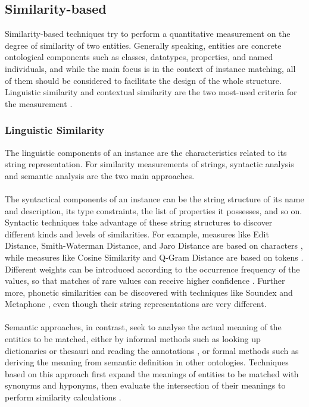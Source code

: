 \subsection{Similarity-based}

Similarity-based techniques try to perform a quantitative measurement on the degree of similarity of two entities. Generally speaking, entities are concrete ontological components such as classes, datatypes, properties, and named individuals, and while the main focus is in the context of instance matching, all of them should be considered to facilitate the design of the whole structure. Linguistic similarity and contextual similarity are the two most-used criteria for the measurement \cite{DBLP:conf/ic3k/Nguyen015}.

\subsubsection{Linguistic Similarity}

The linguistic components of an instance are the characteristics related to its string representation. For similarity measurements of strings, syntactic analysis and semantic analysis are the two main approaches.
\\\\
The syntactical components of an instance can be the string structure of its name and description, its type constraints, the list of properties it possesses, and so on. Syntactic techniques take advantage of these string structures to discover different kinds and levels of similarities. For example, measures like Edit Distance, Smith-Waterman Distance, and Jaro Distance are based on characters \cite{DBLP:journals/corr/SekerAAM14,DBLP:journals/algorithmica/FaroMP20}, while measures like Cosine Similarity and Q-Gram Distance are based on tokens \cite{DBLP:conf/wea/KobayashiHYS20}. Different weights can be introduced according to the occurrence frequency of the values, so that matches of rare values can receive higher confidence \cite{DBLP:conf/dsit/WangN20}. Further more, phonetic similarities can be discovered with techniques like Soundex \cite{DBLP:journals/corr/BhattiWIHS14} and Metaphone \cite{DBLP:conf/cicling/JordaoR12}, even though their string representations are very different.
\\\\
Semantic approaches, in contrast, seek to analyse the actual meaning of the entities to be matched, either by informal methods such as looking up dictionaries or thesauri and reading the annotations \cite{DBLP:journals/corr/abs-0907-2209,DBLP:conf/ifip12/LinS08,DBLP:conf/esws/Vennesland15}, or formal methods such as deriving the meaning from semantic definition in other ontologies. Techniques based on this approach first expand the meanings of entities to be matched with synonyms and hyponyms, then evaluate the intersection of their meanings to perform similarity calculations \cite{DBLP:conf/ieaaie/AssiMD19}.

